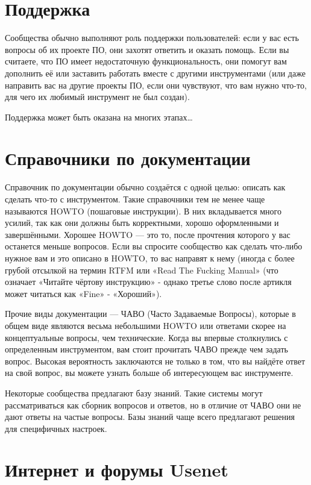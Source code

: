 \documentclass[12pt]{book}
\begin{document}
\section{Поддержка}

Сообщества обычно выполняют роль поддержки пользователей: если у вас есть вопросы об их проекте ПО, они захотят ответить и оказать помощь. Если вы считаете, что ПО имеет недостаточную функциональность, они помогут вам дополнить её или заставить работать вместе с другими инструментами (или даже направить вас на другие проекты ПО, если они чувствуют, что вам нужно что-то, для чего их любимый инструмент не был создан).

Поддержка может быть оказана на многих этапах\ldots

\section{Справочники по документации}

Справочник по документации обычно создаётся с одной целью: описать как сделать что-то с инструментом. Такие справочники тем не менее чаще называются HOWTO (пошаговые инструкции). В них вкладывается много усилий, так как они должны быть корректными, хорошо оформленными и завершёнными. Хорошее HOWTO — это то, после прочтения которого у вас останется меньше вопросов.  Если вы спросите сообщество как сделать что-либо нужное вам и это описано в HOWTO, то вас направят к нему (иногда с более грубой отсылкой на термин RTFM или «Read The Fucking Manual» (что означает «Читайте чёртову инструкцию» - однако третье слово после артикля может читаться как «Fine» - «Хороший»).

Прочие виды документации — ЧАВО (Часто Задаваемые Вопросы), которые в общем виде являются весьма небольшими HOWTO или ответами скорее на концептуальные вопросы, чем технические. Когда вы впервые столкнулись с определенным инструментом, вам стоит прочитать ЧАВО прежде чем задать вопрос. Высокая вероятность заключаются не только в том, что вы найдёте ответ на свой вопрос, вы можете узнать больше об интересующем вас инструменте. 

Некоторые сообщества предлагают базу знаний. Такие системы могут рассматриваться как сборник вопросов и ответов, но в отличие от ЧАВО они не дают ответы на частые вопросы. Базы знаний чаще всего предлагают решения для специфичных настроек. 

\section{Интернет и форумы Usenet}
\end{document}
